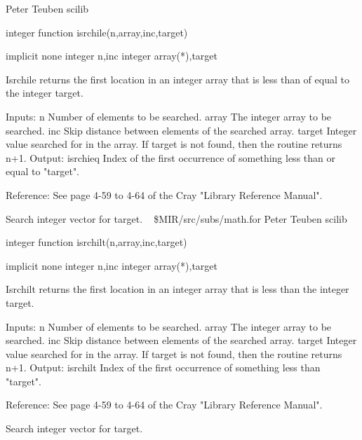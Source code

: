 \newline {} Peter Teuben
\newline {} scilib
\par{\tenpoint
{\eightpoint\begintt
        integer function isrchile(n,array,inc,target)

        implicit none
        integer n,inc
        integer array(*),target

  Isrchile returns the first location in an integer array that is less than
  of equal to the integer target.

  Inputs:
    n          Number of elements to be searched.
    array      The integer array to be searched.
    inc        Skip distance between elements of the searched array.
    target     Integer value searched for in the array. If target is not
               found, then the routine returns n+1.
  Output:
    isrchieq   Index of the first occurrence of something less than or
               equal to "target".

  Reference:
  See page 4-59 to 4-64 of the Cray "Library Reference Manual".
\endtt}
\par}
%
\noindent Search integer vector for target.
\newline \ 
\newline {} \$MIR/src/subs/math.for
\newline {} Peter Teuben
\newline {} scilib
\par{\tenpoint
{\eightpoint\begintt
        integer function isrchilt(n,array,inc,target)

        implicit none
        integer n,inc
        integer array(*),target

  Isrchilt returns the first location in an integer array that is less 
  than the integer target.

  Inputs:
    n          Number of elements to be searched.
    array      The integer array to be searched.
    inc        Skip distance between elements of the searched array.
    target     Integer value searched for in the array. If target is not
               found, then the routine returns n+1.
  Output:
    isrchilt   Index of the first occurrence of something less than "target".

  Reference:
  See page 4-59 to 4-64 of the Cray "Library Reference Manual".
\endtt}
\par}
%
\noindent Search integer vector for target.
\newline \ 
